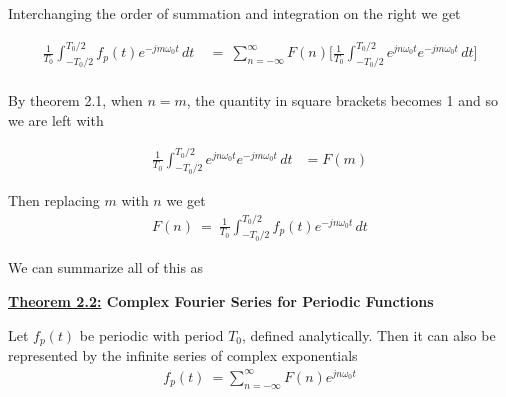 \documentclass[10pt]{article}
\begin{document}
\noindent
Interchanging the order of summation and integration on the right we get

\begin{equation} \label{eq:2.23.1}
	\begin{aligned}
		\frac{1}{T_0}\int_{-T_0/2}^{T_0/2} f_p(t) e^{-jm\omega_0t} \,dt \: &= \: \sum_{n=-\infty}^{\infty} F(n) \Big[ \frac{1}{T_0}\int_{-T_0/2}^{T_0/2} e^{jn\omega_0t} e^{-jm\omega_0t} \,dt \Big] \\
	\end{aligned}
\end{equation}

\noindent
By theorem 2.1, when $n=m$, the quantity in square brackets becomes 1 and so we are left with

\begin{equation} \label{eq:2.23.2}
	\begin{aligned}
		\frac{1}{T_0}\int_{-T_0/2}^{T_0/2} e^{jn\omega_0t} e^{-jm\omega_0t} \,dt &= F(m)
	\end{aligned}
\end{equation}

\noindent
Then replacing $m$ with $n$ we get
\begin{equation} \label{eq:2.26}
\begin{aligned}
    F(n) \: = \: \frac{1}{T_0}\int_{-T_0/2}^{T_0/2} f_p(t) e^{-jn\omega_0t} \,dt
\end{aligned}
\end{equation}

\noindent \cite{morrison1994fourier}

\vspace{4mm}

\noindent
We can summarize all of this as 

\vspace{4mm}
\noindent
\textbf{\underline{Theorem 2.2:} Complex Fourier Series for Periodic Functions}

\vspace{1mm}
Let $f_p(t)$ be periodic with period $T_0$, defined analytically. Then it can also be represented by the infinite series of complex exponentials
\begin{equation} \label{eq:2.27}
\begin{aligned}
    f_p(t) \: = \sum_{n=-\infty}^{\infty} F(n) e^{jn\omega_0t}
\end{aligned}
\end{equation}
\end{document}
